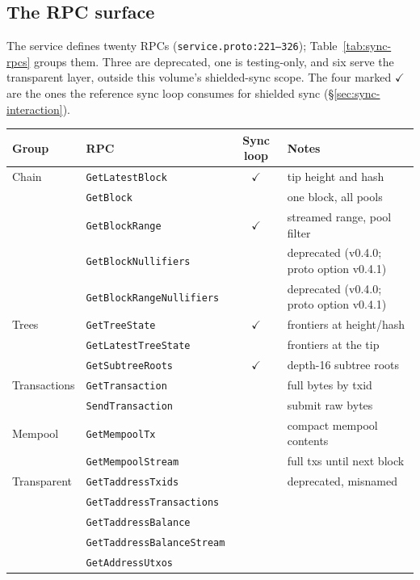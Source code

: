 \documentclass[11pt,a4paper]{article}
\theoremstyle{definition}
\begin{document}
\subsection{The RPC surface}\label{sec:sync-rpcs}

The service defines twenty RPCs (\texttt{service.proto:221--326});
Table~\ref{tab:sync-rpcs} groups them. Three are deprecated, one is
testing-only, and six serve the transparent layer, outside this volume's
shielded-sync scope. The four marked $\checkmark$ are the ones the
reference sync loop consumes for shielded sync
(\S\ref{sec:sync-interaction}).

\begin{table}[htbp]
\centering
\small
\begin{tabular}{@{}llcl@{}}
\toprule
Group & RPC & Sync loop & Notes \\
\midrule
Chain & \texttt{GetLatestBlock} & $\checkmark$ & tip height and hash \\
 & \texttt{GetBlock} & & one block, all pools \\
 & \texttt{GetBlockRange} & $\checkmark$ & streamed range, pool filter \\
 & \texttt{GetBlockNullifiers} & & deprecated (v0.4.0; proto option
   v0.4.1) \\
 & \texttt{GetBlockRangeNullifiers} & & deprecated (v0.4.0; proto option
   v0.4.1) \\
\addlinespace
Trees & \texttt{GetTreeState} & $\checkmark$ & frontiers at height/hash \\
 & \texttt{GetLatestTreeState} & & frontiers at the tip \\
 & \texttt{GetSubtreeRoots} & $\checkmark$ & depth-16 subtree roots \\
\addlinespace
Transactions & \texttt{GetTransaction} & & full bytes by txid \\
 & \texttt{SendTransaction} & & submit raw bytes \\
\addlinespace
Mempool & \texttt{GetMempoolTx} & & compact mempool contents \\
 & \texttt{GetMempoolStream} & & full txs until next block \\
\addlinespace
Transparent & \texttt{GetTaddressTxids} & & deprecated, misnamed \\
 & \texttt{GetTaddressTransactions} & & \\
 & \texttt{GetTaddressBalance} & & \\
 & \texttt{GetTaddressBalanceStream} & & \\
 & \texttt{GetAddressUtxos} & & \\

\end{tabular}
\end{table}
\end{document}
